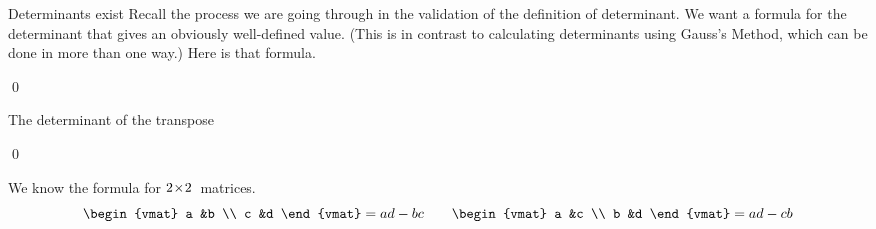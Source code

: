 \documentclass[10pt,t]{beamer}
\begin{document}
\begin{frame}{Determinants exist}
Recall the process we are going through in the validation of the definition 
of determinant.
We want a formula for the determinant that gives an
obviously well-defined value.
(This is in contrast to calculating determinants using Gauss's Method,
which can be done in more than one way.)
Here is that formula.

\end{frame}
\begin{frame}
\lm[lm:DeterminantsExist]

\pf
{}

\pause
{}

\pause
{}
\end{frame}
\begin{frame}
\end{frame}
\begin{frame}
\noindent{}
\end{frame}
\begin{frame}
\end{frame}
\begin{frame}
\end{frame}
\begin{frame}
\qed
\end{frame}




\begin{frame}{The determinant of the transpose}
\th[th:DetMatrixEqualsDetTrans]

\pf
{}
\end{frame}
\begin{frame}
\end{frame}
\begin{frame}
\qed

\pause
\ex
We know the formula for $2 \! \times \! 2$~matrices.
\begin{equation*}
  \begin{vmat}
    a  &b  \\
    c  &d
  \end{vmat}
  =ad-bc
  \qquad
  \begin{vmat}
    a  &c  \\
    b  &d
  \end{vmat}
  =ad-cb
\end{equation*}
\end{frame}
\end{document}
